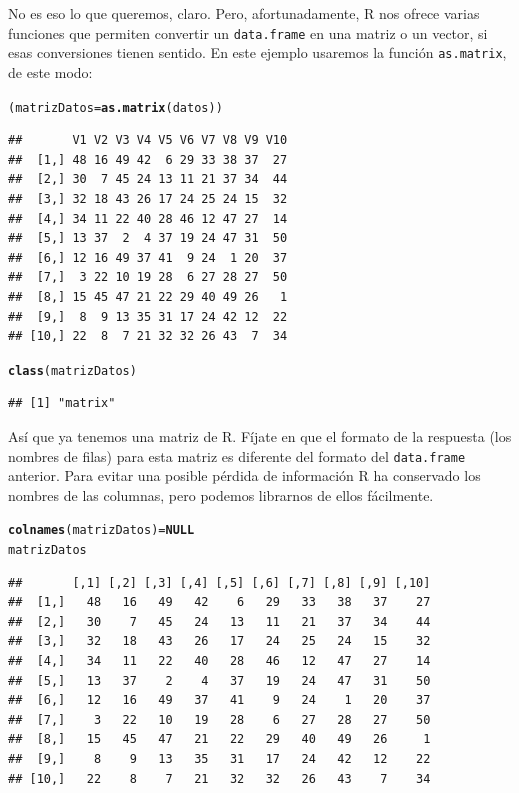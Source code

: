 \documentclass[10pt,a4paper]{article}\usepackage[]{graphicx}\usepackage[]{color}
\makeatletter
\newcommand{\hlstd}[1]{\textcolor[rgb]{0.345,0.345,0.345}{#1}}%
\newcommand{\hlkwa}[1]{\textcolor[rgb]{0.161,0.373,0.58}{\textbf{#1}}}%
\newcommand{\hlkwb}[1]{\textcolor[rgb]{0.69,0.353,0.396}{#1}}%
\newcommand{\hlkwd}[1]{\textcolor[rgb]{0.737,0.353,0.396}{\textbf{#1}}}%
\newenvironment{kframe}{%
 \def\at@end@of@kframe{}%
 \ifinner\ifhmode%
  \def\at@end@of@kframe{\end{minipage}}%
  \begin{minipage}{\columnwidth}%
 \fi\fi%
 \def\FrameCommand##1{\hskip\@totalleftmargin \hskip-\fboxsep
 \colorbox{shadecolor}{##1}\hskip-\fboxsep
     \hskip-\linewidth \hskip-\@totalleftmargin \hskip\columnwidth}%
 \MakeFramed {\advance\hsize-\width
   \@totalleftmargin\z@ \linewidth\hsize
   \@setminipage}}%
 {\par\unskip\endMakeFramed%
 \at@end@of@kframe}
\newenvironment{knitrout}{}{} %
\makeatother
\begin{document}
No es eso lo que queremos, claro. Pero, afortunadamente, R nos ofrece varias funciones que permiten convertir un {\tt data.frame} en una matriz o un vector, si esas conversiones tienen sentido. En este ejemplo usaremos la función {\tt as.matrix}, de este modo:
\begin{knitrout}
\color{fgcolor}\begin{kframe}
\begin{alltt}
\hlstd{(matrizDatos} \hlkwb{=} \hlkwd{as.matrix}\hlstd{(datos))}
\end{alltt}
\begin{verbatim}
##       V1 V2 V3 V4 V5 V6 V7 V8 V9 V10
##  [1,] 48 16 49 42  6 29 33 38 37  27
##  [2,] 30  7 45 24 13 11 21 37 34  44
##  [3,] 32 18 43 26 17 24 25 24 15  32
##  [4,] 34 11 22 40 28 46 12 47 27  14
##  [5,] 13 37  2  4 37 19 24 47 31  50
##  [6,] 12 16 49 37 41  9 24  1 20  37
##  [7,]  3 22 10 19 28  6 27 28 27  50
##  [8,] 15 45 47 21 22 29 40 49 26   1
##  [9,]  8  9 13 35 31 17 24 42 12  22
## [10,] 22  8  7 21 32 32 26 43  7  34
\end{verbatim}
\begin{alltt}
\hlkwd{class}\hlstd{(matrizDatos)}
\end{alltt}
\begin{verbatim}
## [1] "matrix"
\end{verbatim}
\end{kframe}
\end{knitrout}
Así que ya tenemos una matriz de R. Fíjate en que el formato de la respuesta (los nombres de filas) para esta matriz es diferente del formato del {\tt data.frame} anterior. Para evitar una posible pérdida de información R ha conservado los nombres de las columnas, pero podemos librarnos de ellos fácilmente.
\begin{knitrout}
\color{fgcolor}\begin{kframe}
\begin{alltt}
\hlkwd{colnames}\hlstd{(matrizDatos)} \hlkwb{=} \hlkwa{NULL}
\hlstd{matrizDatos}
\end{alltt}
\begin{verbatim}
##       [,1] [,2] [,3] [,4] [,5] [,6] [,7] [,8] [,9] [,10]
##  [1,]   48   16   49   42    6   29   33   38   37    27
##  [2,]   30    7   45   24   13   11   21   37   34    44
##  [3,]   32   18   43   26   17   24   25   24   15    32
##  [4,]   34   11   22   40   28   46   12   47   27    14
##  [5,]   13   37    2    4   37   19   24   47   31    50
##  [6,]   12   16   49   37   41    9   24    1   20    37
##  [7,]    3   22   10   19   28    6   27   28   27    50
##  [8,]   15   45   47   21   22   29   40   49   26     1
##  [9,]    8    9   13   35   31   17   24   42   12    22
## [10,]   22    8    7   21   32   32   26   43    7    34
\end{verbatim}
\end{kframe}
\end{knitrout}
\end{document}
